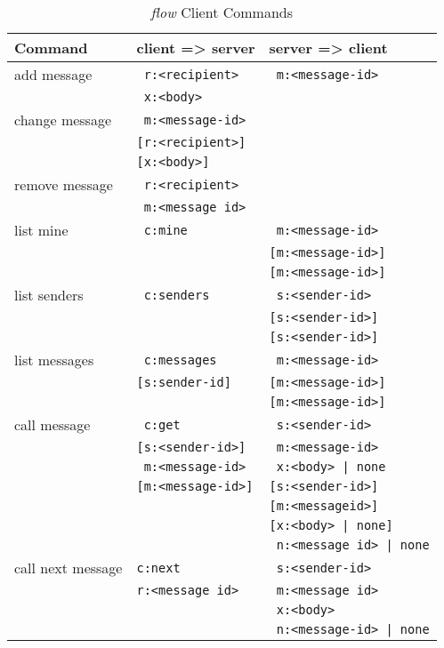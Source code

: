 \documentclass[twoside,a4paper,english,12pt,authoryear,openright]{book}
\newcommand{\flow}{\textit{flow} }
\begin{document}
\begin{table}[htdp]
\begin{center}
\begin{tabular}{ | l | l | l |  }

\hline
Command & client => server & server => client  \\
\hline

add message  & \texttt{ r:<recipient>}  & \texttt{ m:<message-id>}  \\
& \texttt{ x:<body>}  &  \\
\hline

change message  & \texttt{ m:<message-id>}  &  \\
& \texttt{[r:<recipient>]}  &  \\
& \texttt{[x:<body>]}  &  \\
\hline

remove message  & \texttt{ r:<recipient>}  &  \\
& \texttt{ m:<message id>} &\\
\hline

list mine  & \texttt{ c:mine}  & \texttt{ m:<message-id>}  \\
&& \texttt{[m:<message-id>]}  \\
&& \texttt{[m:<message-id>]}  \\
\hline

list senders  & \texttt{ c:senders}  & \texttt{ s:<sender-id>}  \\
&& \texttt{[s:<sender-id>]}  \\
&& \texttt{[s:<sender-id>]}  \\
\hline

list messages  & \texttt{ c:messages}  & \texttt{ m:<message-id>} \\
& \texttt{[s:sender-id]}  & \texttt{[m:<message-id>]} \\
&& \texttt{[m:<message-id>]} \\
\hline

call message  & \texttt{ c:get}  &  \texttt{ s:<sender-id>}  \\
& \texttt{[s:<sender-id>]} & \texttt{ m:<message-id>}  \\
& \texttt{ m:<message-id>} & \texttt{ x:<body> | none}  \\
& \texttt{[m:<message-id>]} & \texttt{[s:<sender-id>]} \\
&& \texttt{[m:<messageid>]} \\
&& \texttt{[x:<body> | none]} \\
&& \texttt{ n:<message id> | none} \\
\hline

call next message  & \texttt{c:next}  & \texttt{ s:<sender-id>}  \\
& \texttt{r:<message id>}  & \texttt{ m:<message id>} \\
&& \texttt{ x:<body>} \\
&& \texttt{ n:<message-id> | none} \\
\hline


\end{tabular}
\end{center}
\caption{\flow Client Commands}
\label{default}
\end{table} %
\end{document}
